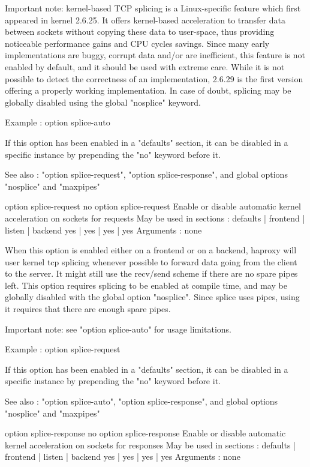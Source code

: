   Important note: kernel-based TCP splicing is a Linux-specific feature which
  first appeared in kernel 2.6.25. It offers kernel-based acceleration to
  transfer data between sockets without copying these data to user-space, thus
  providing noticeable performance gains and CPU cycles savings. Since many
  early implementations are buggy, corrupt data and/or are inefficient, this
  feature is not enabled by default, and it should be used with extreme care.
  While it is not possible to detect the correctness of an implementation,
  2.6.29 is the first version offering a properly working implementation. In
  case of doubt, splicing may be globally disabled using the global "nosplice"
  keyword.

  Example :
        option splice-auto

  If this option has been enabled in a "defaults" section, it can be disabled
  in a specific instance by prepending the "no" keyword before it.

  See also : "option splice-request", "option splice-response", and global
             options "nosplice" and "maxpipes"


option splice-request
no option splice-request
  Enable or disable automatic kernel acceleration on sockets for requests
  May be used in sections :   defaults | frontend | listen | backend
                                 yes   |    yes   |   yes  |   yes
  Arguments : none

  When this option is enabled either on a frontend or on a backend, haproxy
  will user kernel tcp splicing whenever possible to forward data going from
  the client to the server. It might still use the recv/send scheme if there
  are no spare pipes left. This option requires splicing to be enabled at
  compile time, and may be globally disabled with the global option "nosplice".
  Since splice uses pipes, using it requires that there are enough spare pipes.

  Important note: see "option splice-auto" for usage limitations.

  Example :
        option splice-request

  If this option has been enabled in a "defaults" section, it can be disabled
  in a specific instance by prepending the "no" keyword before it.

  See also : "option splice-auto", "option splice-response", and global options
             "nosplice" and "maxpipes"


option splice-response
no option splice-response
  Enable or disable automatic kernel acceleration on sockets for responses
  May be used in sections :   defaults | frontend | listen | backend
                                 yes   |    yes   |   yes  |   yes
  Arguments : none

